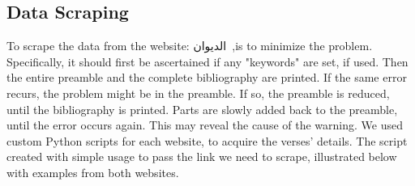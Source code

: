 \subsection{Data Scraping}\label{sec:Data_Scrap}
To scrape the data from the website: \textarabic{الديوان}~\cite{diwan},is to minimize the problem. Specifically, it should first be ascertained if any "keywords" are set, if used. Then the entire preamble and the complete bibliography are printed. If the same error recurs, the problem might be in the preamble. If so, the preamble is reduced, until the bibliography is printed. Parts are slowly added back to the preamble, until the error occurs again. This may reveal the cause of the warning. We used custom Python scripts for each website, to acquire the verses’ details. The script created with simple usage to pass the link we need to scrape, illustrated below with examples from both websites.


